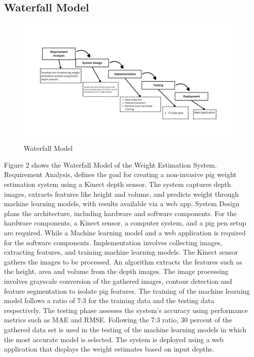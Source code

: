 {\subsection { Waterfall Model}
\begin{figure}[h]
	\centering
	\includegraphics[height=0.4\textheight]{figures/Requirement Analysis (4)}
	\caption{Waterfall Model}
	\label{fig:Waterfall Model}
\end{figure}

Figure 2 shows the Waterfall Model of the Weight Estimation System. Requirement Analysis, defines the goal for creating a non-invasive pig weight estimation system using a Kinect depth sensor. The system captures depth images, extracts features like height and volume, and predicts weight through machine learning models, with results available via a web app. System Design plans the architecture, including hardware and software components. For the hardware components, a Kinect sensor, a computer system, and a pig pen setup are required. While a Machine learning model and a web application is required for the software components. Implementation involves collecting images, extracting features, and training machine learning models. The Kinect sensor gathers the images to be processed. An algorithm extracts the features such as the height, area and volume from the depth images. The image processing involves grayscale conversion of the gathered images, contour detection and feature segmentation to isolate pig features. The training of the machine learning model follows a ratio of 7:3 for the training data and the testing data respectively. The testing phase assesses the system's accuracy using performance metrics such as MAE and RMSE. Following the 7:3 ratio, 30 percent of the gathered data set is used in the testing of the machine learning models in which the most accurate model is selected. The system is deployed using a web application that displays the weight estimates based on input depths.
\newpage
}

